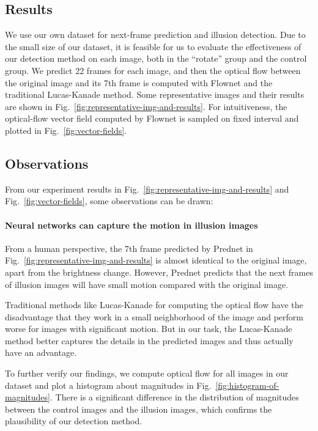 \documentclass[journal]{IEEEtran}
\begin{document}

\subsection{Results}

We use our own dataset for next-frame prediction and illusion detection. Due to the small size of our dataset, it is feasible for us to evaluate the effectiveness of our detection method on each image, both in the ``rotate'' group and the control group. We predict 22 frames for each image, and then the optical flow between the original image and its 7th frame is computed with Flownet and the traditional Lucas-Kanade method. Some representative images and their results are shown in Fig.~\ref{fig:representative-img-and-results}. For intuitiveness, the optical-flow vector field computed by Flownet is sampled on fixed interval and plotted in Fig.~\ref{fig:vector-fields}.

\subsection{Observations}

From our experiment results in Fig.~\ref{fig:representative-img-and-results} and Fig.~\ref{fig:vector-fields}, some observations can be drawn:

\paragraph{Neural networks can capture the motion in illusion images} From a human perspective, the 7th frame predicted by Prednet in Fig.~\ref{fig:representative-img-and-results} is almost identical to the original image, apart from the brightness change. However, Prednet predicts that the next frames of illusion images will have small motion compared with the original image.

Traditional methods like Lucas-Kanade for computing the optical flow have the disadvantage that they work in a small neighborhood of the image and perform worse for images with significant motion. But in our task, the Lucas-Kanade method better captures the details in the predicted images and thus actually have an advantage.

To further verify our findings, we compute optical flow for all images in our dataset and plot a histogram about magnitudes in Fig.~\ref{fig:histogram-of-magnitudes}. There is a significant difference in the distribution of magnitudes between the control images and the illusion images, which confirms the plausibility of our detection method.
\end{document}
